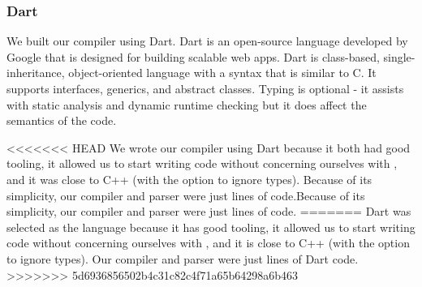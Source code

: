 
\subsubsection{Dart}
We built our compiler using Dart\cite{dartlang}.
Dart is an open-source language developed by Google that is
designed for building scalable web apps. Dart is class-based,
single-inheritance,
object-oriented language with a syntax that is similar to C. It supports
interfaces, generics, and abstract classes. Typing is optional - it assists
with static analysis and dynamic runtime checking but it does affect the
semantics of the code.

<<<<<<< HEAD
We wrote our compiler using Dart because it both had good tooling, it allowed
	us to start writing code without concerning ourselves with ,
	and it was close to C++ (with the option to ignore types).
Because of its simplicity, our compiler and parser were just  lines of code.Because of its simplicity, our compiler and parser were just  lines of code.
=======
Dart was selected as the language because it has good tooling, it allowed
	us to start writing code without concerning ourselves with ,
	and it is close to C++ (with the option to ignore types).
Our compiler and parser were just  lines of Dart code.
>>>>>>> 5d6936856502b4c31c82c4f71a65b64298a6b463
